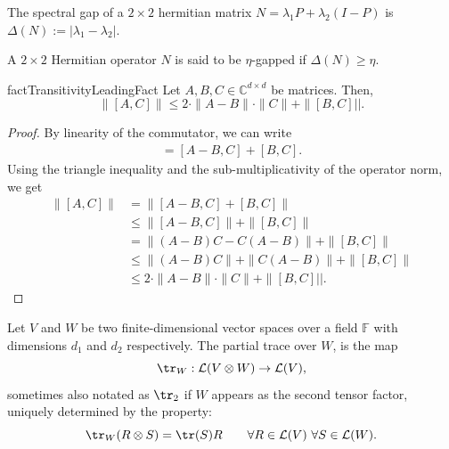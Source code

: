 \begin{definition}
    The spectral gap of a $2 \times 2$ hermitian matrix $N = \lambda_1 P + \lambda_2 (I - P)$ is $\Delta(N) := |\lambda_1 - \lambda_2|$.
\end{definition}

\begin{definition}
    A $2\times 2$ Hermitian operator $N$ is said to be $\eta$-gapped if $\Delta(N) \geq \eta$.
\end{definition}

\begin{restatable}{fact}{TransitivityLeadingFact}\label{lem:transitivity-of-almost-commutatitivty}
Let $A,B,C \in \mathbb{C}^{d \times d}$ be matrices. Then,
\begin{equation}
\| [A,C] \| \leq 2 \cdot \|A-B\| \cdot \|C\|+ \| [B,C]||.    
\end{equation}
\end{restatable}
\begin{proof}
By linearity of the commutator, we can write
\begin{align}
[A,C] = [A-B,C] + [B,C].    
\end{align}
Using the triangle inequality and the sub-multiplicativity of the operator norm, we get
\begin{align}
\| [A,C] \| &= \| [A-B,C] + [B,C] \| \\    
&\leq \| [A-B,C]\| + \|[B,C] \| \\
&= \| (A-B)C - C(A-B)\| + \|[B,C] \| \\
&\leq \| (A-B)C\| + \|C(A-B)\| + \|[B,C] \|\\
&\leq 2 \cdot \|A-B\| \cdot \|C\| + \| [B,C]||.
\end{align}
\end{proof}


\begin{definition}
    Let $V$ and $W$ be two finite-dimensional vector spaces over a field $\mathbb{F}$ with dimensions $d_1$ and $d_2$ respectively. The partial trace over $W$, is the map 
    \begin{equation}
        \tr_W: \mathcal{L}(V \otimes W) \to \mathcal{L}(V),
    \end{equation}
    sometimes also notated as $\tr_2$ if $W$ appears as the second tensor factor, uniquely determined by the property:
    \begin{equation}
        \tr_W(R \otimes S) = \tr(S) R \quad\quad \forall R \in \mathcal{L}(V)\ \forall S \in \mathcal{L}(W).
    \end{equation}
\end{definition}


